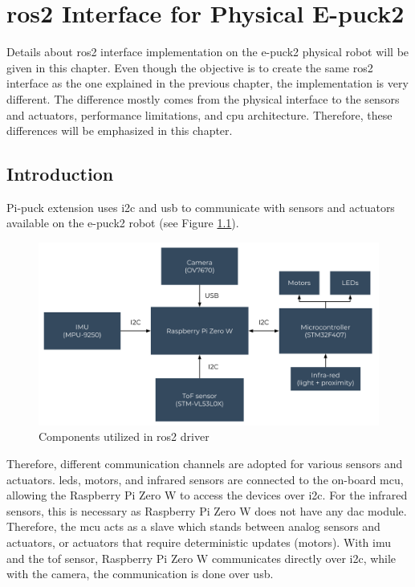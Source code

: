 \chapter{\acs{ros2} Interface for Physical E-puck2}
\label{chap:physical}

Details about \ac{ros2} interface implementation on the e-puck2 physical robot will be given in this chapter.
Even though the objective is to create the same \ac{ros2} interface as the one explained in the previous chapter, the implementation is very different.
The difference mostly comes from the physical interface to the sensors and actuators, performance limitations, and \ac{cpu} architecture.
Therefore, these differences will be emphasized in this chapter.

\section{Introduction}

Pi-puck extension uses \ac{i2c} and \ac{usb} to communicate with sensors and actuators available on the e-puck2 robot (see Figure \ref{fig:physical:general}).

\begin{figure}[H]
    \centering
    \includegraphics[width=\textwidth]{physical/figures/general.pdf}
    \caption{Components utilized in \ac{ros2} driver}
    \label{fig:physical:general}
\end{figure}

Therefore, different communication channels are adopted for various sensors and actuators.
\acp{led}, motors, and infrared sensors are connected to the on-board \ac{mcu}, allowing the Raspberry Pi Zero W to access the devices over \ac{i2c}.
For the infrared sensors, this is necessary as Raspberry Pi Zero W does not have any \ac{dac} module. 
Therefore, the \ac{mcu} acts as a slave which stands between analog sensors and actuators, or actuators that require deterministic updates (motors).
With \ac{imu} and the \ac{tof} sensor, Raspberry Pi Zero W communicates directly over \ac{i2c}, while with the camera, the communication is done over \ac{usb}. 

